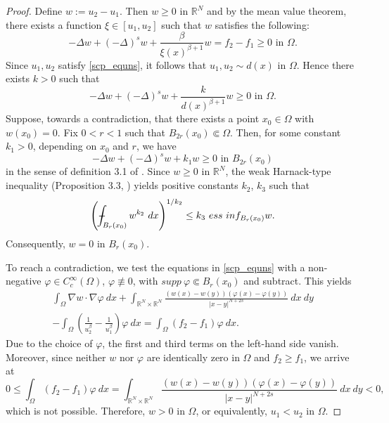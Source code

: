 \documentclass[reqno,oneside]{amsart}
\theoremstyle{definition}
\theoremstyle{remark}
\numberwithin{equation}{section}
\def\Xint#1{\mathchoice
   {\XXint\displaystyle\textstyle{#1}}%
   {\XXint\textstyle\scriptstyle{#1}}%
   {\XXint\scriptstyle\scriptscriptstyle{#1}}%
   {\XXint\scriptscriptstyle\scriptscriptstyle{#1}}%
   \!\int}
\def\XXint#1#2#3{{\setbox0=\hbox{$#1{#2#3}{\int}$}
     \vcenter{\hbox{$#2#3$}}\kern-.5\wd0}}
\def\dashint{\Xint-}
\newcommand{\ba}{\beta}
\newcommand{\Om} {\Omega}
\newcommand{\sr}{\mathbb{R}}
\newcommand{\na} {\nabla}
\newcommand{\test}{C_c^{\infty} (\Om)}
\newcommand{\De} {\Delta}
\begin{document}
\begin{proof}
    Define $w:= u_2 - u_1$. Then $w \geq 0$ in $\sr^N$ and by the mean value theorem, there exists a function $\xi \in [u_1, u_2]$ such that $w$ satisfies the following:
    \begin{equation*}
        -\Delta w + (-\De)^s w + \frac{\beta}{\xi (x) ^{\ba +1}} w = f_2 - f_1 \geq 0 \text{ in } \Om.
    \end{equation*}
    Since $u_1, u_2$ satisfy \eqref{scp_equns}, it follows that $u_1, u_2 \sim d(x)$ in $\Om$. Hence there exists $k>0$ such that
    \begin{equation}\label{w_equn}
        -\Delta w + (-\De)^s w + \frac{k}{d(x)^{\ba +1}} w \geq 0 \text{ in } \Om.
    \end{equation}
    Suppose, towards a contradiction, that there exists a point $x_0 \in \Om$ with $w(x_0) =0$. Fix $0<r<1$ such that $B_{2r} (x_0) \Subset \Om$. Then, for some constant $k_1 >0$, depending on $x_0$ and $r$, we have
    \begin{equation*}
        -\Delta w + (-\De)^s w + k_1 w \geq 0 \text{ in } B_{2r} (x_0)
    \end{equation*}
    in the sense of definition 3.1 of \cite{biagi2024multiplicity}. Since $w \geq 0 \text{ in } \sr^N$, the weak Harnack-type inequality (Proposition 3.3, \cite{biagi2024multiplicity}) yields positive constants $k_2$, $k_3$ such that
    \begin{equation*}
        \left( \dashint_{B_r (x_0)} w^{k_2}\ dx \right)^{1/k_2} \leq k_3\ ess\ inf_{B_r (x_0)} w.
    \end{equation*}
    Consequently, $w=0$ in $B_r (x_0)$.

    To reach a contradiction, we test the equations in \eqref{scp_equns} with a non-negative $\varphi \in \test$, $\varphi \not\equiv 0$, with $supp\ \varphi \Subset B_r (x_0)$ and subtract. This yields
    \begin{multline*}
        \int_{\Om} \na w \cdot \na \varphi\ dx + \int_{\sr^N \times \sr^N} \frac{\left(w(x) - w(y) \right) \left(\varphi(x) - \varphi(y) \right)}{|x-y|^{N+2s}}\ dx\ dy\\
        - \int_{\Om} \left( \frac{1}{u_2^{\beta}} - \frac{1}{u_1^{\beta}} \right) \varphi\ dx = \int_{\Om} \left( f_2-f_1 \right) \varphi\ dx.
    \end{multline*}
    Due to the choice of $\varphi$, the first and third terms on the left-hand side vanish. Moreover, since neither $w$ nor $\varphi$ are identically zero in $\Om$ and $f_2 \geq f_1$, we arrive at
    \begin{equation*}
        0\leq \int_{\Om} \left( f_2-f_1 \right) \varphi\ dx = \int_{\sr^N \times \sr^N} \frac{\left(w(x) - w(y) \right) \left(\varphi(x) - \varphi(y) \right)}{|x-y|^{N+2s}}\ dx\ dy < 0,
    \end{equation*}
    which is not possible. Therefore, $w>0$ in $\Om$, or equivalently, $u_1 < u_2$ in $\Om$.
\end{proof}
\end{document}
